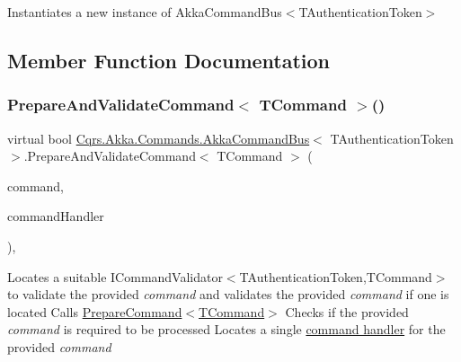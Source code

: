 Instantiates a new instance of Akka\+Command\+Bus$<$\+T\+Authentication\+Token$>$ 



\subsection{Member Function Documentation}
\mbox{\label{classCqrs_1_1Akka_1_1Commands_1_1AkkaCommandBus_ae3e5f1725bceb0359aedb74ded530858_ae3e5f1725bceb0359aedb74ded530858}} 
\subsubsection{\texorpdfstring{Prepare\+And\+Validate\+Command$<$ T\+Command $>$()}{PrepareAndValidateCommand< TCommand >()}}
{\footnotesize\ttfamily virtual bool \hyperlink{classCqrs_1_1Akka_1_1Commands_1_1AkkaCommandBus}{Cqrs.\+Akka.\+Commands.\+Akka\+Command\+Bus}$<$ T\+Authentication\+Token $>$.Prepare\+And\+Validate\+Command$<$ T\+Command $>$ (\begin{DoxyParamCaption}\item[{T\+Command}]{command,  }\item[{out \hyperlink{classCqrs_1_1Bus_1_1RouteHandlerDelegate}{Route\+Handler\+Delegate}}]{command\+Handler }\end{DoxyParamCaption})\hspace{0.3cm}{\ttfamily [protected]}, {\ttfamily [virtual]}}



Locates a suitable I\+Command\+Validator$<$\+T\+Authentication\+Token,\+T\+Command$>$ to validate the provided {\itshape command}  and validates the provided {\itshape command}  if one is located Calls \hyperlink{classCqrs_1_1Akka_1_1Commands_1_1AkkaCommandBus_a9755a84c0b971ce0862abdc2783422ce_a9755a84c0b971ce0862abdc2783422ce}{Prepare\+Command$<$\+T\+Command$>$} Checks if the provided {\itshape command}  is required to be processed Locates a single \hyperlink{}{command handler} for the provided {\itshape command}  

